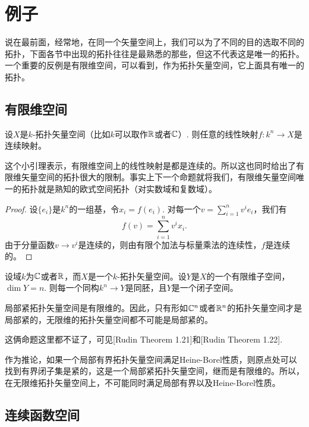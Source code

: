 \chapter{例子}

说在最前面，经常地，在同一个矢量空间上，我们可以为了不同的目的选取不同的拓扑，下面各节中出现的拓扑往往是最熟悉的那些，但这不代表这是唯一的拓扑。一个重要的反例是有限维空间，可以看到，作为拓扑矢量空间，它上面具有唯一的拓扑。

\section{有限维空间}

\begin{lem}
设$X$是$k$-拓扑矢量空间（比如$k$可以取作$\mathbb{R}$或者$\mathbb{C}$）. 则任意的线性映射$f:k^n\to X$是连续映射。
\end{lem}

这个小引理表示，有限维空间上的线性映射是都是连续的。所以这也同时给出了有限维矢量空间的拓扑很大的限制。事实上下一个命题就将我们，有限维矢量空间唯一的拓扑就是熟知的欧式空间拓扑（对实数域和复数域）。

\begin{proof}
设$\{e_i\}$是$k^n$的一组基，令$x_i=f(e_i)$. 对每一个$v=\sum_{i=1}^nv^ie_i$，我们有
\[
	f(v)=\sum_{i=1}^nv^ix_i.
\]
由于分量函数$v\to v^i$是连续的，则由有限个加法与标量乘法的连续性，$f$是连续的。
\end{proof}

\begin{pro}
	设域$k$为$\mathbb{C}$或者$\mathbb{R}$，而$X$是一个$k$-拓扑矢量空间。设$Y$是$X$的一个有限维子空间，$\dim Y=n$. 则每一个同构$k^n\to Y$是同胚，且$Y$是一个闭子空间。
\end{pro}

\begin{pro}\label{1.46}
局部紧拓扑矢量空间是有限维的。因此，只有形如$\mathbb{C}^n$或者$\mathbb{R}^n$的拓扑矢量空间才是局部紧的，无限维的拓扑矢量空间都不可能是局部紧的。
\end{pro}

这俩命题这里都不证了，可见[Rudin Theorem 1.21]和[Rudin Theorem 1.22].

作为推论，如果一个局部有界拓扑矢量空间满足Heine-Borel性质，则原点处可以找到有界闭子集是紧的，这是一个局部紧拓扑矢量空间，继而是有限维的。所以，在无限维拓扑矢量空间上，不可能同时满足局部有界以及Heine-Borel性质。

\section{连续函数空间}

